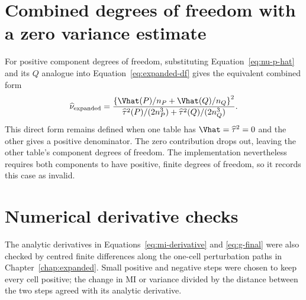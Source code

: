 \section{Combined degrees of freedom with a zero variance estimate}
\label{sec:zero-component}

For positive component degrees of freedom, substituting
Equation~\eqref{eq:nu-p-hat} and its \(Q\) analogue into
Equation~\eqref{eq:expanded-df} gives the equivalent combined form
\begin{equation}
  \widehat\nu_{\mathrm{expanded}}
  =
  \frac{
  \left\{\Vhat(P)/n_P+\Vhat(Q)/n_Q\right\}^2
  }{
  \widehat\tau^2(P)/(2n_P^3)
  +
  \widehat\tau^2(Q)/(2n_Q^3)
  }.
  \label{eq:expanded-df-direct}
\end{equation}
This direct form remains defined when one table has
\(\Vhat=\widehat\tau^2=0\) and the other gives a positive denominator.
The zero contribution drops out, leaving the other table's component degrees
of freedom. The implementation nevertheless requires both components to have
positive, finite degrees of freedom, so it records this case as invalid.

\section{Numerical derivative checks}
\label{sec:derivative-checks}

The analytic derivatives in Equations~\eqref{eq:mi-derivative} and
\eqref{eq:g-final} were also checked by centred finite differences along
the one-cell perturbation paths in Chapter~\ref{chap:expanded}. Small
positive and negative steps were chosen to keep every cell positive; the
change in MI or variance divided by the distance between the two steps
agreed with its analytic derivative.
